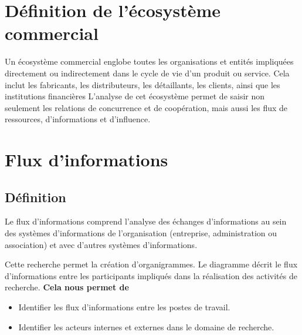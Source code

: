 \documentclass[edit,12pt,a4paper,ChapStyle,oneside,doubleinterligne]{report}
\begin{document}
\section{Définition de l'écosystème commercial}
Un écosystème commercial englobe toutes les organisations et entités impliquées directement ou indirectement dans le cycle de vie d'un produit ou service. Cela inclut les fabricants, les distributeurs, les détaillants, les clients, ainsi que les institutions financières L'analyse de cet écosystème permet de saisir non seulement les relations de concurrence et de coopération, mais aussi les flux de ressources, d'informations et d'influence\cite{1}.
\section{Flux d'informations}
\subsection{Définition}


Le flux d'informations comprend l'analyse des échanges d'informations au sein des systèmes d'informations de l'organisation (entreprise, administration ou association) et avec d'autres systèmes d'informations.


Cette recherche permet la création d'organigrammes. Le diagramme décrit le flux d'informations entre les participants impliqués dans la réalisation des activités de recherche.
\cite{flux}
\textbf{Cela nous permet de}
\begin{itemize}
    \item Identifier les flux d'informations entre les postes de travail.
    \item Identifier les acteurs internes et externes dans le domaine de recherche.
\end{itemize}
\end{document}
